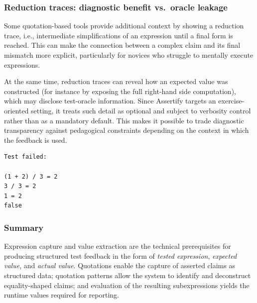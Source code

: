 \subsubsection{Reduction traces: diagnostic benefit vs.\ oracle leakage} %
\label{sec:reduction-traces}

Some quotation-based tools provide additional context by showing a reduction
trace, i.e., intermediate simplifications of an expression until a final form is
reached. This can make the connection between a complex claim and its final
mismatch more explicit, particularly for novices who struggle to mentally execute
expressions.

\skipM At the same time, reduction traces can reveal how an expected value was
constructed (for instance by exposing the full right-hand side computation),
which may disclose test-oracle information. Since Assertify targets an
exercise-oriented setting, it treats such detail as optional and subject to
verbosity control rather than as a mandatory default. This makes it possible to
trade diagnostic transparency against pedagogical constraints depending on the
context in which the feedback is used.

\begin{lstlisting}[caption={Example of a reduction trace (adapted from the Unquote user guide)},label={lst:unquote-trace}]
Test failed:

(1 + 2) / 3 = 2
3 / 3 = 2
1 = 2
false
\end{lstlisting}

\subsubsection{Summary} %
\label{sec:mechanisms-summary}

Expression capture and value extraction are the technical prerequisites for
producing structured test feedback in the form of \emph{tested expression},
\emph{expected value}, and \emph{actual value}. Quotations enable the capture of
asserted claims as structured data; quotation patterns allow the system to
identify and deconstruct equality-shaped claims; and evaluation of the resulting
subexpressions yields the runtime values required for reporting.

